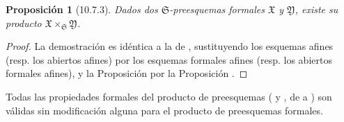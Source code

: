 \documentclass[oneside]{amsart}
\theoremstyle{ega-env-style}
\theoremstyle{ega-thm-env-style}
\newtheorem*{proposition}{Proposición}
\theoremstyle{ega-defn-env-style}
\let\EGAOriginalLabel\label
\renewcommand{\label}[1]{\phantomsection\EGAOriginalLabel{#1}}
\begin{document}
\begin{proposition}[10.7.3]
\label{I.10.7.3}
Dados dos $\mathfrak{S}$-preesquemas formales $\mathfrak{X}$ y $\mathfrak{Y}$, existe su producto $\mathfrak{X}\times_{\mathfrak{S}}\mathfrak{Y}$.
\end{proposition}

\begin{proof}
La demostración es idéntica a la de , sustituyendo los esquemas afines (resp. los abiertos afines) por los esquemas formales afines (resp. los abiertos formales afines), y la Proposición  por la Proposición .
\end{proof}

Todas las propiedades formales del producto de preesquemas ( y , de  a ) son válidas sin modificación alguna para el producto de preesquemas formales.
\end{document}
